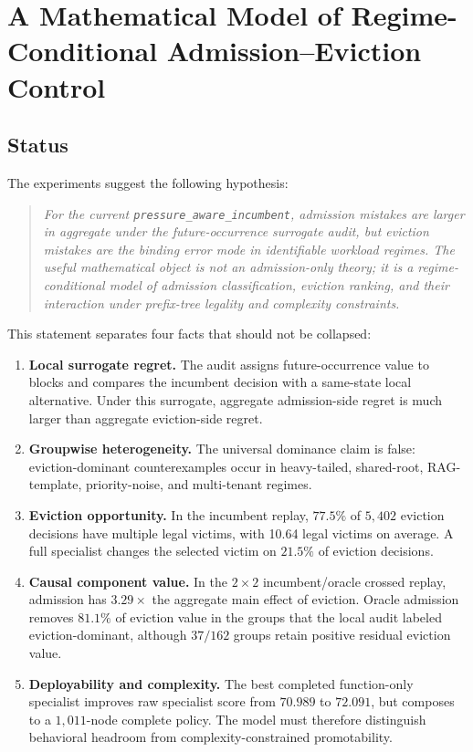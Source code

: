 \documentclass[11pt]{article}
\newcommand{\identifier}[1]{\nolinkurl{#1}}
\begin{document}
\section{A Mathematical Model of Regime-Conditional Admission--Eviction Control}
\label{app:admission-mathematical-model}

\subsection{Status}

The experiments suggest the following hypothesis:

\begin{quote}
\emph{For the current \identifier{pressure\_aware\_incumbent}, admission mistakes are
larger in aggregate under the future-occurrence surrogate audit, but eviction mistakes
are the binding error mode in identifiable workload regimes.  The useful mathematical
object is not an admission-only theory; it is a regime-conditional model of admission
classification, eviction ranking, and their interaction under prefix-tree legality and
complexity constraints.}
\end{quote}

This statement separates four facts that should not be collapsed:

\begin{enumerate}
  \item \textbf{Local surrogate regret.}  The audit assigns future-occurrence value to
  blocks and compares the incumbent decision with a same-state local alternative.
  Under this surrogate, aggregate admission-side regret is much larger than aggregate
  eviction-side regret.
  \item \textbf{Groupwise heterogeneity.}  The universal dominance claim is false:
  eviction-dominant counterexamples occur in heavy-tailed, shared-root, RAG-template,
  priority-noise, and multi-tenant regimes.
  \item \textbf{Eviction opportunity.}  In the incumbent replay, \(77.5\%\) of
  \(5{,}402\) eviction decisions have multiple legal victims, with 10.64 legal victims
  on average.  A full specialist changes the selected victim on \(21.5\%\) of eviction
  decisions.
  \item \textbf{Causal component value.}  In the \(2\times2\) incumbent/oracle crossed
  replay, admission has \(3.29\times\) the aggregate main effect of eviction.
  Oracle admission removes \(81.1\%\) of eviction value in the groups that the local
  audit labeled eviction-dominant, although \(37/162\) groups retain positive residual
  eviction value.
  \item \textbf{Deployability and complexity.}  The best completed function-only
  specialist improves raw specialist score from \(70.989\) to \(72.091\), but composes
  to a \(1{,}011\)-node complete policy.  The model must therefore distinguish
  behavioral headroom from complexity-constrained promotability.
\end{enumerate}
\end{document}
